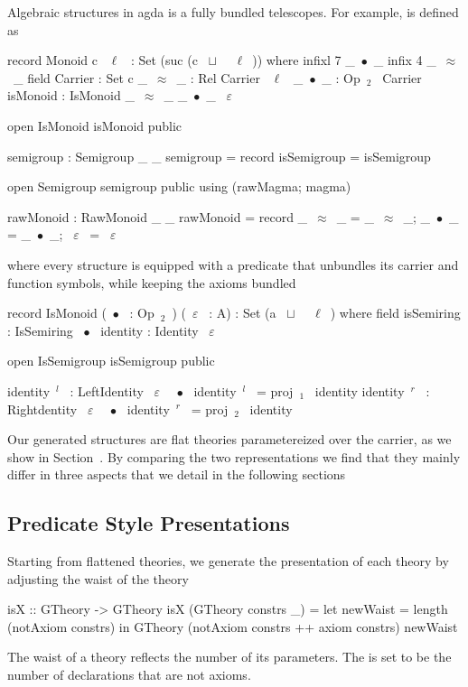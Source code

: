 Algebraic structures in agda is a fully bundled telescopes. For example,  is defined as
\begin{agdacode}
record Monoid c ~$\ell$~ : Set (suc (c ~$\sqcup$~ ~$\ell$~)) where 
  infixl 7 _~$\bullet$~_
  infix 4 _~$\approx$~_
  field 
   Carrier : Set c 
   _~$\approx$~_ : Rel Carrier ~$\ell$~ 
   _~$\bullet$~_ : Op~$_2$~ Carrier 
   isMonoid : IsMonoid _~$\approx$~_ _~$\bullet$~_ ~$\varepsilon$~ 
   
   open IsMonoid isMonoid public
   
   semigroup : Semigroup _ _
   semigroup = record { isSemigroup = isSemigroup }
   
   open Semigroup semigroup public using (rawMagma; magma)
   
   rawMonoid : RawMonoid _ _
   rawMonoid = record { _~$\approx$~_ = _~$\approx$~_; _~$\bullet$~_ = _~$\bullet$~_; ~$\varepsilon$~ = ~$\varepsilon$~}
\end{agdacode}
where every structure is equipped with a predicate that unbundles its carrier and function symbols, while keeping the axioms bundled 
\begin{agdacode}
record IsMonoid (~$\bullet$~ : Op~$_2$~) (~$\varepsilon$~ : A) : Set (a ~$\sqcup$~ ~$\ell$~) where 
  field 
   isSemiring : IsSemiring ~$\bullet$~ 
   identity : Identity ~$\varepsilon$~
     
  open IsSemigroup isSemigroup public
     
  identity~$^l$~ : LeftIdentity ~$\varepsilon$~ ~$\bullet$~ 
  identity~$^l$~ = proj~$_1$~ identity  
  identity~$^r$~ : Rightdentity ~$\varepsilon$~ ~$\bullet$~ 
  identity~$^r$~ = proj~$_2$~ identity           
\end{agdacode}
Our generated structures are flat theories parametereized over the carrier, as we show in Section~. By comparing the two representations we find that they mainly differ in three aspects that we detail in the following sections 
\subsection{Predicate Style Presentations}
Starting from flattened theories, we generate the  presentation of each theory by adjusting the waist of the theory
\begin{hscode}
isX :: GTheory -> GTheory
isX (GTheory constrs _) =
  let newWaist = length (notAxiom constrs) 
  in GTheory (notAxiom constrs ++ axiom constrs) newWaist
\end{hscode}
The waist of a theory reflects the number of its parameters. The  is set to be the number of declarations that are not axioms. 

